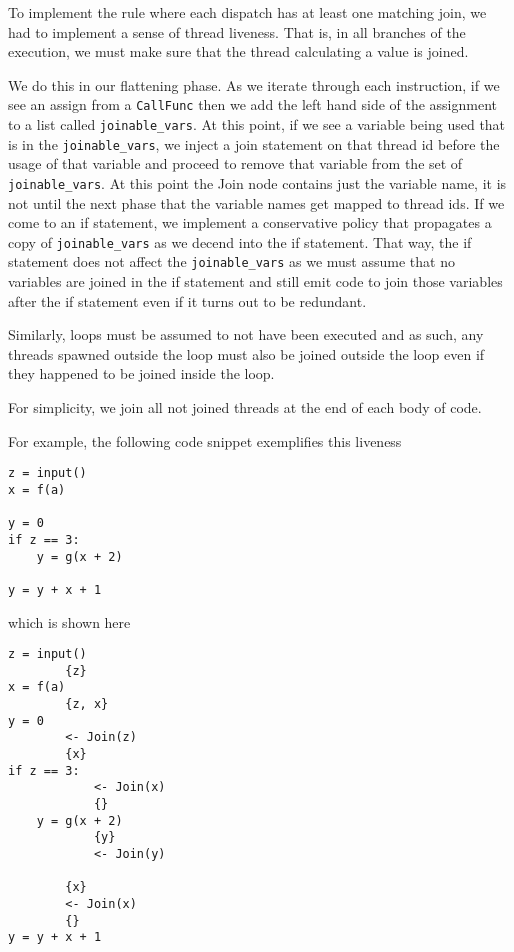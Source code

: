 \documentclass{acm_proc_article-sp}
\begin{document}
To implement the rule where each dispatch has at least one matching join, we
had to implement a sense of thread liveness. That is, in all branches of the
execution, we must make sure that the thread calculating a value is joined.

We do this in our flattening phase. As we iterate through each instruction, if
we see an assign from a \verb|CallFunc| then we add the left hand side of the
assignment to a list called \verb|joinable_vars|. At this point, if we see a
variable being used that is in the \verb|joinable_vars|, we inject a join
statement on that thread id before the usage of that variable and proceed to
remove that variable from the set of \verb|joinable_vars|. At this point the
Join node contains just the variable name, it is not until the next phase that
the variable names get mapped to thread ids.  If we come to an if statement, we
implement a conservative policy that propagates a copy of \verb|joinable_vars|
as we decend into the if statement. That way, the if statement does not affect
the \verb|joinable_vars| as we must assume that
no variables are joined in the if statement and still emit code to join those
variables after the if statement even if it turns out to be redundant.

Similarly, loops must be assumed to not have been executed and as such,
any threads spawned outside the loop must also be joined outside the loop even
if they happened to be joined inside the loop.

For simplicity, we join all not joined threads at the end of each body of code.


For example, the following code snippet exemplifies this liveness

\begin{verbatim}
z = input()
x = f(a)

y = 0
if z == 3:
    y = g(x + 2)

y = y + x + 1
\end{verbatim}

which is shown here

\begin{verbatim}
z = input()
        {z}
x = f(a)
        {z, x}
y = 0
        <- Join(z)
        {x}
if z == 3:
            <- Join(x)
            {}
    y = g(x + 2)
            {y}
            <- Join(y)

        {x}
        <- Join(x)
        {}
y = y + x + 1
\end{verbatim}
\end{document}
